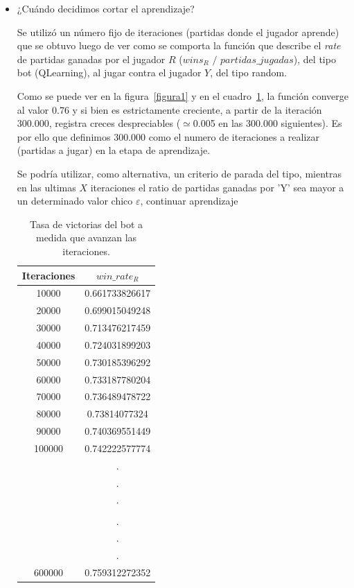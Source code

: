 \documentclass[10pt,a4paper]{article}
\begin{document}
\begin{itemize}
	\item ¿Cuándo decidimos cortar el aprendizaje?

	Se utilizó un número fijo de iteraciones (partidas donde el jugador aprende) que se obtuvo luego de ver como se comporta la función que describe el \emph{rate} de partidas ganadas por el jugador $R$ ($wins_R$ $\slash$ $partidas\_jugadas$), del tipo bot (QLearning), al jugar contra el jugador $Y$, del tipo random. 
	
	Como se puede ver en la figura~\ref{figura1}  y en el cuadro~\ref{tabla1}, la función converge al valor 0.76 y si bien es estrictamente creciente, a partir de la iteración 300.000, registra creces despreciables ($\simeq$0.005 en las 300.000 siguientes). Es por ello que definimos 300.000 como el numero de iteraciones a realizar (partidas a jugar) en la etapa de aprendizaje.
	
	Se podría utilizar, como alternativa, un criterio de parada del tipo, mientras en las ultimas $X$ iteraciones el ratio de partidas ganadas por 'Y' sea mayor a un determinado valor chico $\varepsilon$, continuar aprendizaje
	
	\begin{table}[H]
    \centering
	\begin{tabular}{c | c}
		Iteraciones & $win\_rate_R$ \\
		\hline
		\hline
       10000  & 0.661733826617 \\
       20000  & 0.699015049248 \\
       30000  &  0.713476217459 \\
       40000  &  0.724031899203 \\
       50000  &  0.730185396292 \\
       60000  &  0.733187780204 \\
	   70000  &  0.736489478722 \\
       80000  &  0.73814077324 \\
       90000  &  0.740369551449 \\
       100000  & 0.742222577774 \\
				& . \\
				& . \\
				& . \\
       \color{red}{300000 } & \color{red}{0.754387485375} \\
				& . \\
				& . \\
				& . \\
       600000  &  0.759312272352 
	\end{tabular}
	\caption{Tasa de victorias del bot a medida que avanzan las iteraciones.}
	\label{tabla1}
	\end{table}
	

\end{itemize}
\end{document}
